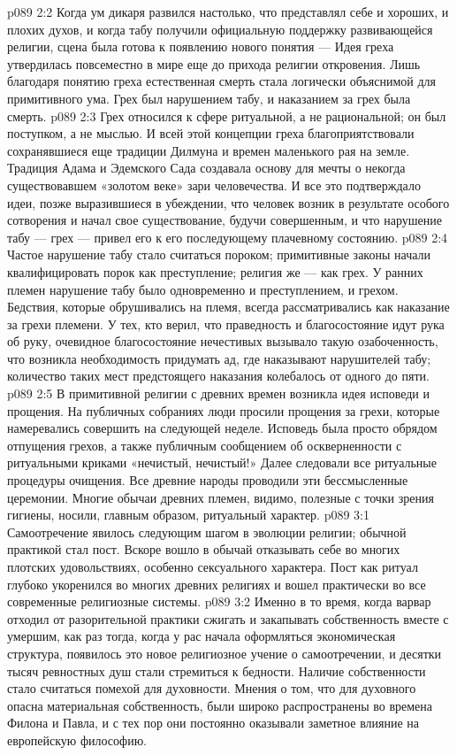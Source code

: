 \vs p089 2:2 Когда ум дикаря развился настолько, что представлял себе и хороших, и плохих духов, и когда табу получили официальную поддержку развивающейся религии, сцена была готова к появлению нового понятия ---  Идея греха утвердилась повсеместно в мире еще до прихода религии откровения. Лишь благодаря понятию греха естественная смерть стала логически объяснимой для примитивного ума. Грех был нарушением табу, и наказанием за грех была смерть.
\vs p089 2:3 Грех относился к сфере ритуальной, а не рациональной; он был поступком, а не мыслью. И всей этой концепции греха благоприятствовали сохранявшиеся еще традиции Дилмуна и времен маленького рая на земле. Традиция Адама и Эдемского Сада создавала основу для мечты о некогда существовавшем «золотом веке» зари человечества. И все это подтверждало идеи, позже выразившиеся в убеждении, что человек возник в результате особого сотворения и начал свое существование, будучи совершенным, и что нарушение табу --- грех --- привел его к его последующему плачевному состоянию.
\vs p089 2:4 Частое нарушение табу стало считаться пороком; примитивные законы начали квалифицировать порок как преступление; религия же --- как грех. У ранних племен нарушение табу было одновременно и преступлением, и грехом. Бедствия, которые обрушивались на племя, всегда рассматривались как наказание за грехи племени. У тех, кто верил, что праведность и благосостояние идут рука об руку, очевидное благосостояние нечестивых вызывало такую озабоченность, что возникла необходимость придумать ад, где наказывают нарушителей табу; количество таких мест предстоящего наказания колебалось от одного до пяти.
\vs p089 2:5 В примитивной религии с древних времен возникла идея исповеди и прощения. На публичных собраниях люди просили прощения за грехи, которые намеревались совершить на следующей неделе. Исповедь была просто обрядом отпущения грехов, а также публичным сообщением об оскверненности с ритуальными криками «нечистый, нечистый!» Далее следовали все ритуальные процедуры очищения. Все древние народы проводили эти бессмысленные церемонии. Многие обычаи древних племен, видимо, полезные с точки зрения гигиены, носили, главным образом, ритуальный характер.
\vs p089 3:1 Самоотречение явилось следующим шагом в эволюции религии; обычной практикой стал пост. Вскоре вошло в обычай отказывать себе во многих плотских удовольствиях, особенно сексуального характера. Пост как ритуал глубоко укоренился во многих древних религиях и вошел практически во все современные религиозные системы.
\vs p089 3:2 Именно в то время, когда варвар отходил от разорительной практики сжигать и закапывать собственность вместе с умершим, как раз тогда, когда у рас начала оформляться экономическая структура, появилось это новое религиозное учение о самоотречении, и десятки тысяч ревностных душ стали стремиться к бедности. Наличие собственности стало считаться помехой для духовности. Мнения о том, что для духовного опасна материальная собственность, были широко распространены во времена Филона и Павла, и с тех пор они постоянно оказывали заметное влияние на европейскую философию.
